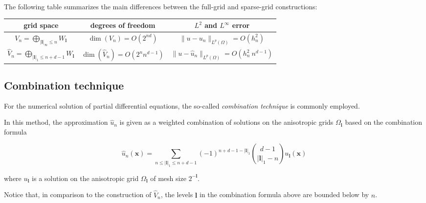 The following table summarizes the main differences between the full-grid and sparse-grid constructions:

\renewcommand{\arraystretch}{1.5}
\begin{center}
\begin{tabular}{c c c}
    \hline
    \textbf{grid space} & \textbf{degrees of freedom} & \textbf{$L^2$ and $L^\infty$ error} \\
    \hline
    $V_n=\bigoplus_{|\mathbf l|_\infty\le n} W_\mathbf{l}$ & $\dim(V_n)=O(2^{nd})$ & $\|u-u_n\|_{L^p(\Omega)}=O(h_n^2)$ \\
    $\widehat V_n=\bigoplus_{|\mathbf l|_1\le n+d-1} W_\mathbf{l}$ & $\dim(\widehat V_n)=O(2^n n^{d-1})$ & $\|u-\widehat u_n\|_{L^p(\Omega)}=O(h_n^2\:n^{d-1})$ \\
\end{tabular}
\end{center}
\vspace{1em}



\subsection{Combination technique}

For the numerical solution of partial differential equations,
the so-called \emph{combination technique} is commonly employed.

In this method, the approximation $\widehat u_n$ is given as a
weighted combination of solutions on the anisotropic
grids $\Omega_\mathbf{l}$
based on the combination formula

$$
\widehat u_n(\mathbf x)
=
\sum_{n\le |\mathbf l|_1\le n+d-1}
(-1)^{n+d-1-|\mathbf l|_1}
\binom{d-1}{|\mathbf l|_1-n}
u_\mathbf{l}(\mathbf x)
$$

where $u_\mathbf{l}$ is a solution on the anisotropic grid
$\Omega_\mathbf{l}$ of mesh size $2^{-\mathbf l}$.


Notice that, in comparison to the construction of $\widehat V_n$,
the levels $\mathbf l$ in the combination formula above are bounded below by $n$.

%


